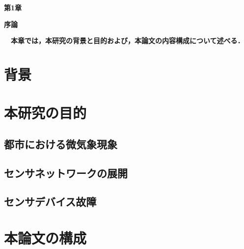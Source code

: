 \setcounter{chapter}{1}
\setcounter{section}{0}

\begin{center}
\vspace{0.5cm}
\huge{\bf 第1章}
\par
\vspace{1cm}
\hrulefill
\par
\vspace{1cm}
\huge{\bf 序論}
\par
\vspace{0.5cm}
\hrulefill
\vspace{1cm}
\par

\begin{flushleft}
\large{{\bf　本章では，本研究の背景と目的および，本論文の内容構成について述べる．}}
\end{flushleft}
\end{center}


\newpage

\section{背景}

\newpage

\section{本研究の目的}
\subsection{都市における微気象現象}

\newpage

\subsection{センサネットワークの展開}

\newpage

\subsection{センサデバイス故障}

\section{本論文の構成}
